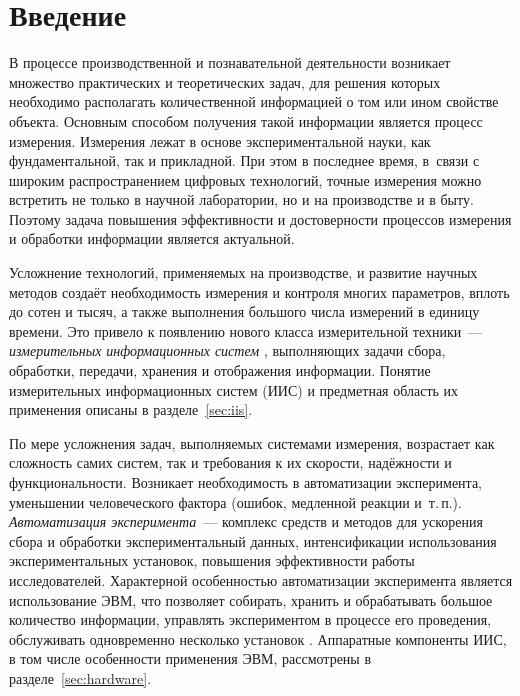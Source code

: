 \documentclass[a4paper, 14pt, titlepage]{extarticle}
\newcounter{firstpage}
\newcommand\firstPageHere{\setcounter{firstpage}{\value{page}}}
\newcommand\sectiontoc[1]{\section*{\centering #1}\addcontentsline{toc}{section}{#1}}
\newcommand{\term}[1]{\emph{#1}}
\let\oldsection\section
\renewcommand{\section}{\newpage\oldsection}
\begin{document}
  \firstPageHere
  \sectiontoc{Введение}\label{sec:intro}

  В процессе производственной и познавательной деятельности возникает множество практических и
  теоретических задач, для решения которых необходимо располагать количественной информацией о том
  или ином свойстве объекта. Основным способом получения такой информации является процесс измерения.
  Измерения лежат в основе экспериментальной науки, как фундаментальной, так и прикладной. При этом
  в последнее время, в~связи с широким распространением цифровых технологий, точные измерения можно
  встретить не только в научной лаборатории, но и на производстве и в быту.
  Поэтому задача повышения эффективности и достоверности процессов измерения и обработки информации
  является актуальной.

  Усложнение технологий, применяемых на производстве, и развитие научных методов создаёт
  необходимость измерения и контроля многих параметров, вплоть до сотен и тысяч, а также
  выполнения большого числа измерений в единицу времени. Это привело к появлению нового класса
  измерительной техники~--- \term{измерительных информационных систем} \cite{rannev-iis,rannev-meas-tech},
  выполняющих задачи сбора, обработки, передачи, хранения и отображения информации.
  Понятие измерительных информационных систем (ИИС) и предметная область их применения описаны в
  разделе~\ref{sec:iis}.

  По мере усложнения задач, выполняемых системами измерения, возрастает как сложность самих систем,
  так и требования к их скорости, надёжности и функциональности. Возникает необходимость в
  автоматизации эксперимента, уменьшении человеческого фактора (ошибок, медленной реакции и~т.\,п.).
  \term{Автоматизация эксперимента}~--- комплекс
  средств и методов для ускорения сбора и обработки экспериментальный данных, интенсификации
  использования экспериментальных установок, повышения эффективности работы исследователей.
  Характерной особенностью автоматизации эксперимента является использование ЭВМ, что позволяет
  собирать, хранить и обрабатывать большое количество информации, управлять экспериментом в процессе
  его проведения, обслуживать одновременно несколько установок \cite{petronevich-automation,sokolov-auto-measure}.
  Аппаратные компоненты ИИС, в том числе особенности применения ЭВМ, рассмотрены в
  разделе~\ref{sec:hardware}.
\end{document}
